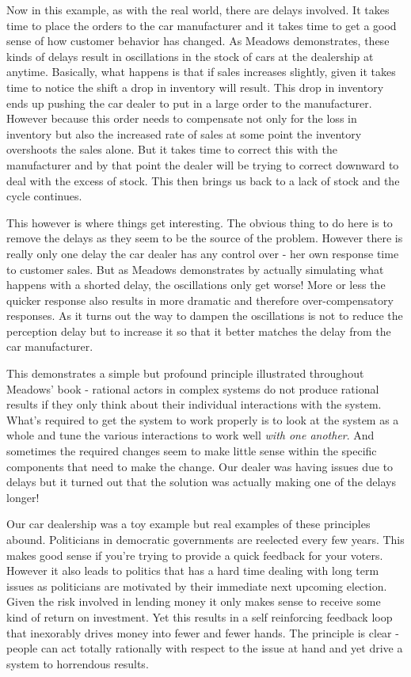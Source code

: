 \documentclass[11pt,a5paper]{book}
\begin{document}
Now in this example, as with the real world, there are delays involved. It takes time to place the orders to the car manufacturer and it takes time to get a good sense of how customer behavior has changed. As Meadows demonstrates, these kinds of delays result in oscillations in the stock of cars at the dealership at anytime. Basically, what happens is that if sales increases slightly, given it takes time to notice the shift a drop in inventory will result. This drop in inventory ends up pushing the car dealer to put in a large order to the manufacturer. However because this order needs to compensate not only for the loss in inventory but also the increased rate of sales at some point the inventory overshoots the sales alone. But it takes time to correct this with the manufacturer and by that point the dealer will be trying to correct downward to deal with the excess of stock. This then brings us back to a lack of stock and the cycle continues.
\newline

This however is where things get interesting. The obvious thing to do here is to remove the delays as they seem to be the source of the problem. However there is really only one delay the car dealer has any control over - her own response time to customer sales. But as Meadows demonstrates by actually simulating what happens with a shorted delay, the oscillations only get worse! More or less the quicker response also results in more dramatic and therefore over-compensatory responses. As it turns out the way to dampen the oscillations is not to reduce the perception delay but to increase it so that it better matches the delay from the car manufacturer.
\newline

This demonstrates a simple but profound principle illustrated throughout Meadows' book - rational actors in complex systems do not produce rational results if they only think about their individual interactions with the system. What's required to get the system to work properly is to look at the system as a whole and tune the various interactions to work well \textit{with one another}. And sometimes the required changes seem to make little sense within the specific components that need to make the change. Our dealer was having issues due to delays but it turned out that the solution was actually making one of the delays longer!
\newline

Our car dealership was a toy example but real examples of these principles abound. Politicians in democratic governments are reelected every few years. This makes good sense if you're trying to provide a quick feedback for your voters. However it also leads to politics that has a hard time dealing with long term issues as politicians are motivated by their immediate next upcoming election. Given the risk involved in lending money it only makes sense to receive some kind of return on investment. Yet this results in a self reinforcing feedback loop that inexorably drives money into fewer and fewer hands. The principle is clear - people can act totally rationally with respect to the issue at hand and yet drive a system to horrendous results.
\newline
\end{document}
